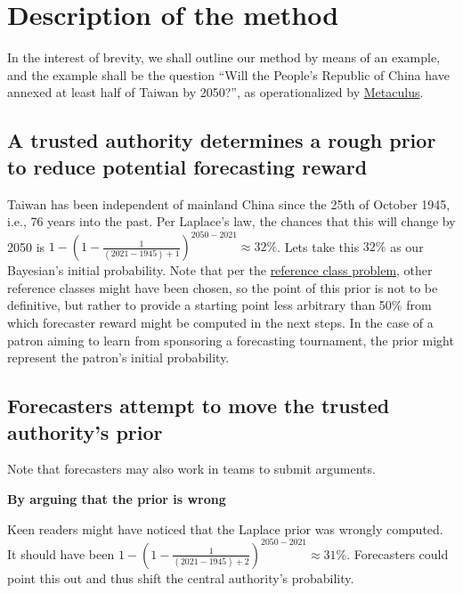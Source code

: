 \documentclass[]{article}
\begin{document}
\hypertarget{description-of-the-method}{%
\section{Description of the method}\label{description-of-the-method}}

In the interest of brevity, we shall outline our method by means of an
example, and the example shall be the question ``Will the People's
Republic of China have annexed at least half of Taiwan by 2050?'', as
operationalized by
\href{https://www.metaculus.com/questions/5320/chinese-annexation-of-most-of-taiwan-by-2050/}{Metaculus}.

\hypertarget{a-trusted-authority-determines-a-rough-prior-to-reduce-potential-forecasting-reward}{%
\subsection{A trusted authority determines a rough prior to reduce
potential forecasting
reward}\label{a-trusted-authority-determines-a-rough-prior-to-reduce-potential-forecasting-reward}}

Taiwan has been independent of mainland China since the 25th of October
1945, i.e., 76 years into the past. Per Laplace's law, the chances that
this will change by 2050 is
\(1-(1-\frac{1}{(2021-1945)+1})^{2050-2021} \approx 32\%\). Lets take
this \(32\%\) as our Bayesian's initial probability. Note that per the
\href{https://en.wikipedia.org/wiki/Reference_class_problem}{reference
class problem}, other reference classes might have been chosen, so the
point of this prior is not to be definitive, but rather to provide a
starting point less arbitrary than 50\% from which forecaster reward
might be computed in the next steps. In the case of a patron aiming to
learn from sponsoring a forecasting tournament, the prior might
represent the patron's initial probability.

\hypertarget{forecasters-attempt-to-move-the-trusted-authoritys-prior}{%
\subsection{Forecasters attempt to move the trusted authority's
prior}\label{forecasters-attempt-to-move-the-trusted-authoritys-prior}}

Note that forecasters may also work in teams to submit arguments.

\textbf{By arguing that the prior is wrong}

Keen readers might have noticed that the Laplace prior was wrongly
computed. It should have been
\(1-(1-\frac{1}{(2021-1945)+2})^{2050-2021} \approx 31\%\). Forecasters
could point this out and thus shift the central authority's probability.
\end{document}
